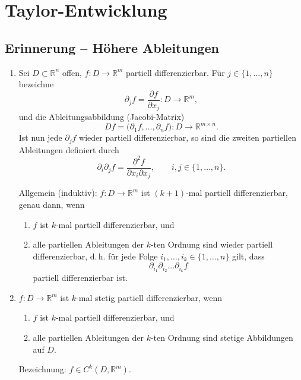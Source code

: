 \newpage
\section{Taylor-Entwicklung}
\label{4.4}

\subsection*{Erinnerung -- Höhere Ableitungen}

\begin{enumerate} %
    \item Sei $D\subset\mathbb{R}^n$ offen, $f\colon D\to\mathbb{R}^m$ partiell differenzierbar. Für $j\in\{1,\dots,n\}$ bezeichne
    $$
    \partial_j f=\frac{\partial f}{\partial x_j}\colon D\to\mathbb{R}^m,
    $$
    und die Ableitungsabbildung (Jacobi-Matrix)
    $$
    Df=\big(\partial_1 f,\dots,\partial_n f\big)\colon D\to\mathbb{R}^{m\times n}.
    $$
    Ist nun jede $\partial_j f$ wieder partiell differenzierbar, so sind die zweiten partiellen Ableitungen definiert durch
    $$
    \partial_i\partial_j f=\frac{\partial^2 f}{\partial x_i\partial x_j},\qquad i,j\in\{1,\dots,n\}.
    $$

    Allgemein (induktiv): $f\colon D\to\mathbb{R}^m$ ist $(k+1)$-mal partiell differenzierbar, genau dann, wenn
    \begin{enumerate}%
        \item $f$ ist $k$-mal partiell differenzierbar, und
        \item alle partiellen Ableitungen der $k$-ten Ordnung sind wieder partiell differenzierbar, d.\,h. für jede Folge $i_1,\dots,i_k\in\{1,\dots,n\}$ gilt, dass
        $$
        \partial_{i_1}\partial_{i_2}\dots\partial_{i_k} f
        $$
        partiell differenzierbar ist.
    \end{enumerate}

    \item $f\colon D\to\mathbb{R}^m$ ist $k$-mal stetig partiell differenzierbar, wenn
    \begin{enumerate}%
        \item $f$ ist $k$-mal partiell differenzierbar, und
        \item alle partiellen Ableitungen der $k$-ten Ordnung sind stetige Abbildungen auf $D$.
    \end{enumerate}

    Bezeichnung: $f\in C^k(D,\mathbb{R}^m)$.


\end{enumerate}
